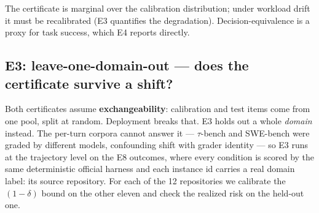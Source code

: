 \documentclass{article}
\newcommand{\LooN}{500}          \newcommand{\LooDomains}{12}
\newcommand{\LooCandidate}{\texttt{distil\_gated}} \newcommand{\LooDelta}{0.05}
\newcommand{\LooPooled}{14.4\%}  \newcommand{\LooHeld}{8}
\newcommand{\LooReps}{2000}
\begin{document}
The certificate is marginal over the calibration distribution; under workload drift
it must be recalibrated (E3 quantifies the degradation). Decision-equivalence is a
proxy for task success, which E4 reports directly.

\subsection{E3: leave-one-domain-out --- does the certificate survive a shift?}
\label{sec:e3}

Both certificates assume \textbf{exchangeability}: calibration and test items come from one
pool, split at random. Deployment breaks that. E3 holds out a whole \emph{domain} instead.
The per-turn corpora cannot answer it --- $\tau$-bench and SWE-bench were graded by
different models, confounding shift with grader identity --- so E3 runs at the trajectory
level on the E8 outcomes, where every condition is scored by the same deterministic official
harness and each instance id carries a real domain label: its source repository. For each of
the \LooDomains{} repositories we calibrate the $(1{-}\delta)$ bound on the other eleven and
check the realized risk on the held-out one.

\begin{table}[t]
\centering\small
\caption{\textbf{E3: leave-one-repository-out} on the E10 trajectory certificate
(\LooCandidate{} vs.\ full, $n{=}\LooN$, $\delta{=}\LooDelta$, pooled divergence
\LooPooled{}). ``exch.\ cov.'' applies the identical certify-then-check procedure to a
\emph{random} block of the same size over \LooReps{} permutations --- the yardstick the
``held?'' column must be read against. $p$ is the permutation probability that a random
same-sized block reaches this repository's realized risk. Per-repository savings is absent:
E8 recorded context reduction only in aggregate ($52.8\%$ for the gated tier).}
\label{tab:e3}

\end{table}
\end{document}

